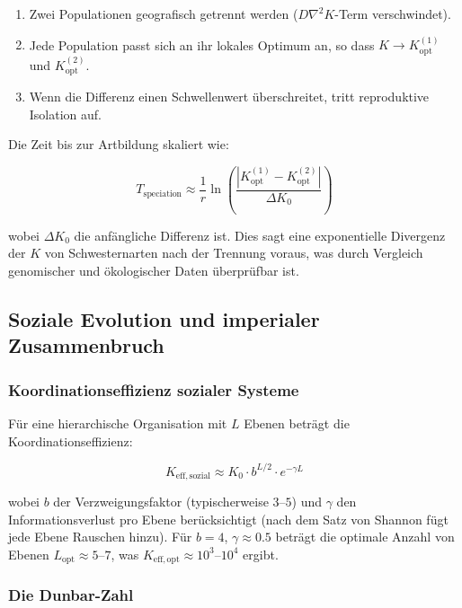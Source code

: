 \documentclass[12pt,a4paper]{article}
\theoremstyle{remark}
\newcommand{\Keffopt}{K_{\mathrm{opt}}}
\begin{document}
	\begin{enumerate}
		\item Zwei Populationen geografisch getrennt werden ($D \nabla^2 K$-Term verschwindet).
		\item Jede Population passt sich an ihr lokales Optimum an, so dass $K \to \Keffopt^{(1)}$ und $\Keffopt^{(2)}$.
		\item Wenn die Differenz einen Schwellenwert überschreitet, tritt reproduktive Isolation auf.
	\end{enumerate}
	
	Die Zeit bis zur Artbildung skaliert wie:
	
	\begin{equation}
		T_{\text{speciation}} \approx \frac{1}{r} \ln\left( \frac{|\Keffopt^{(1)} - \Keffopt^{(2)}|}{\Delta K_0} \right)
		\label{eq:speciation-time}
	\end{equation}
	
	wobei $\Delta K_0$ die anfängliche Differenz ist. Dies sagt eine exponentielle Divergenz der $K$ von Schwesternarten nach der Trennung voraus, was durch Vergleich genomischer und ökologischer Daten überprüfbar ist.
	
	\subsection{Soziale Evolution und imperialer Zusammenbruch}
	\label{subsec:social}
	
	\subsubsection{Koordinationseffizienz sozialer Systeme}
	
	Für eine hierarchische Organisation mit $L$ Ebenen beträgt die Koordinationseffizienz:
	
	\begin{equation}
		K_{\mathrm{eff},\text{sozial}} \approx K_0 \cdot b^{L/2} \cdot e^{-\gamma L}
		\label{eq:social-keff}
	\end{equation}
	
	wobei $b$ der Verzweigungsfaktor (typischerweise $3$--$5$) und $\gamma$ den Informationsverlust pro Ebene berücksichtigt (nach dem Satz von Shannon fügt jede Ebene Rauschen hinzu). Für $b=4$, $\gamma \approx 0.5$ beträgt die optimale Anzahl von Ebenen $L_{\text{opt}} \approx 5$--$7$, was $K_{\mathrm{eff},\text{opt}} \approx 10^3$--$10^4$ ergibt.
	
	\subsubsection{Die Dunbar-Zahl}
	
\end{document}

